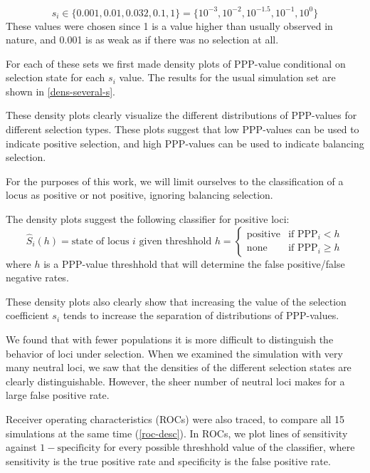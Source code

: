 \documentclass[a4paper,12pt]{article}
\begin{document}
$$
s_i\in\{0.001,0.01,0.032,0.1,1\}=\{10^{-3},10^{-2},10^{-1.5},10^{-1},10^0\}
$$
These values were chosen since 1 is a value higher than usually
observed in nature, and 0.001 is as weak as if there was no selection
at all.

For each of these sets we first made density plots of PPP-value
conditional on selection state for each $s_i$ value. The results for
the usual simulation set are shown in \autoref{dens-several-s}.


These density plots clearly visualize the different distributions of
PPP-values for different selection types. These plots suggest that low
PPP-values can be used to indicate positive selection, and high
PPP-values can be used to indicate balancing selection.

For the purposes of this work, we will limit ourselves to the
classification of a locus as positive or not positive, ignoring
balancing selection.

The density plots suggest the following classifier for positive loci:
$$\hat{S}_{i}(h)=\text{state of locus $i$ given threshhold $h$} = 
\begin{cases}
  \text{positive} & \text{if PPP}_i<h\\
  \text{none}     & \text{if PPP}_i\geq h
\end{cases}
$$
where $h$ is a PPP-value threshhold that will determine the false
positive/false negative rates.

These density plots also clearly show that increasing the value of the
selection coefficient $s_i$ tends to increase the separation of
distributions of PPP-values.

We found that with fewer populations it is more difficult to
distinguish the behavior of loci under selection. When we examined the
simulation with very many neutral loci, we saw that the densities of
the different selection states are clearly distinguishable. However,
the sheer number of neutral loci makes for a large false positive
rate.

Receiver operating characteristics (ROCs) were also traced, to compare
all 15 simulations at the same time (\autoref{roc-desc}). In ROCs, we
plot lines of sensitivity against $1-\text{specificity}$ for every
possible threshhold value of the classifier, where sensitivity is the
true positive rate and specificity is the false positive rate.
\end{document}
